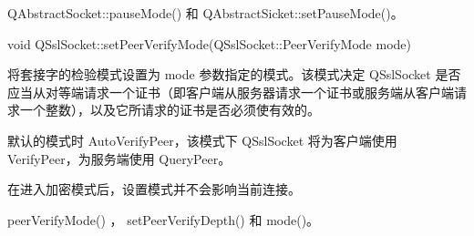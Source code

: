 \begin{notice}
QAbstractSocket::pauseMode() 和 QAbstractSicket::setPauseMode()。
\end{notice}

void QSslSocket::setPeerVerifyMode(QSslSocket::PeerVerifyMode mode)

将套接字的检验模式设置为 mode 参数指定的模式。该模式决定 QSslSocket 是否应当从对等端请求一个证书（即客户端从服务器请求一个证书或服务端从客户端请求一个整数），以及它所请求的证书是否必须使有效的。

默认的模式时 AutoVerifyPeer，该模式下 QSslSocket 将为客户端使用 VerifyPeer，为服务端使用 QueryPeer。

在进入加密模式后，设置模式并不会影响当前连接。

\begin{notice}
peerVerifyMode() ， setPeerVerifyDepth() 和 mode()。
\end{notice}

